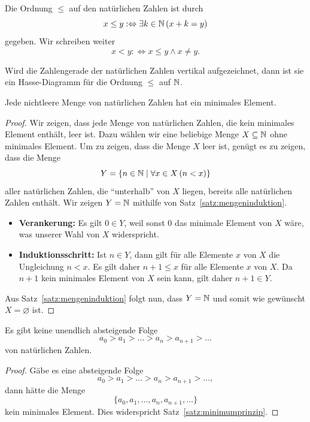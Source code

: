 \begin{df}
Die Ordnung $\leq$ auf den natürlichen Zahlen ist durch
\[
x\leq y:\Leftrightarrow \exists k\in\mathbb{N}\,(x+k=y)
\]
gegeben. Wir schreiben weiter
\[
x<y:\Leftrightarrow x\leq y\land x\neq y.
\]
\end{df}
\begin{rk}
Wird die Zahlengerade der natürlichen Zahlen vertikal aufgezeichnet, dann ist sie ein Hasse-Diagramm für die Ordnung $\leq$ auf $\mathbb{N}$.
\begin{center}
\end{center}
\end{rk}


\begin{satz}\label{satz:minimumprinzip}
Jede nichtleere Menge von natürlichen Zahlen hat ein minimales Element.
\end{satz}
\begin{proof}
Wir zeigen, dass jede Menge von natürlichen Zahlen, die kein minimales Element enthält, leer ist. Dazu wählen wir eine beliebige Menge $X\subseteq\mathbb{N}$ ohne minimales Element. Um zu zeigen, dass die Menge $X$ leer ist, genügt es zu zeigen, dass die Menge
\[
Y=\{n\in\mathbb{N}\mid \forall x\in X\,(n<x) \}
\]
aller natürlichen Zahlen, die ``unterhalb'' von $X$ liegen, bereits alle natürlichen Zahlen enthält. Wir zeigen $Y=\mathbb{N}$ mithilfe von Satz~\ref{satz:mengeninduktion}.
\begin{itemize}
\item \textbf{Verankerung:} Es gilt $0\in Y$, weil sonst $0$ das minimale Element von $X$ wäre, was unserer Wahl von $X$ widerspricht.
\item \textbf{Induktionsschritt:} Ist $n\in Y$, dann gilt für alle Elemente $x$ von $X$ die Ungleichung $n<x$. Es gilt daher $n+1\leq x$ für alle Elemente $x$ von $X$. Da $n+1$ kein minimales Element von $X$ sein kann, gilt daher $n+1\in Y$.
\end{itemize}
Aus Satz~\ref{satz:mengeninduktion} folgt nun, dass $Y=\mathbb{N}$ und somit wie gewünscht $X=\varnothing$ ist.
\end{proof}

\begin{satz}\label{satz:descendingchains}
Es gibt keine unendlich absteigende Folge
\[
a_0>a_1>\dots >a_n>a_{n+1}>\dots
\]
von natürlichen Zahlen.
\end{satz}
\begin{proof}
Gäbe es eine absteigende Folge
\[
a_0>a_1>\dots >a_n>a_{n+1}>\dots,
\]
dann hätte die Menge
\[
\{
a_0,a_1,\dots,a_n,a_{n+1},\dots \}
\]
kein minimales Element. Dies widerspricht Satz~\ref{satz:minimumprinzip}.
\end{proof}

